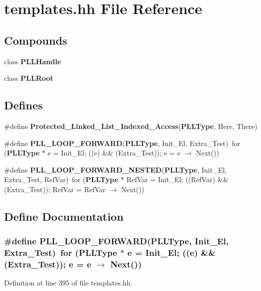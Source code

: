 \section{templates.hh File Reference}
\label{templates_8hh}
\subsection*{Compounds}
\begin{CompactItemize}
\item 
class {\bf PLLHandle}
\item 
class {\bf PLLRoot}
\end{CompactItemize}
\subsection*{Defines}
\begin{CompactItemize}
\item 
\#define {\bf Protected\_\-Linked\_\-List\_\-Indexed\_\-Access}({\bf PLLType}, Here, There)
\item 
\#define {\bf PLL\_\-LOOP\_\-FORWARD}({\bf PLLType}, Init\_\-El, Extra\_\-Test)\ for ({\bf PLLType} $\ast$ e = Init\_\-El; ((e) \&\& (Extra\_\-Test)); e = e $\rightarrow$ Next())
\item 
\#define {\bf PLL\_\-LOOP\_\-FORWARD\_\-NESTED}({\bf PLLType}, Init\_\-El, Extra\_\-Test, Ref\-Var)\ for ({\bf PLLType} $\ast$ Ref\-Var = Init\_\-El; ((Ref\-Var) \&\& (Extra\_\-Test)); Ref\-Var = Ref\-Var $\rightarrow$ Next())
\end{CompactItemize}


\subsection{Define Documentation}
\subsubsection{\setlength{\rightskip}{0pt plus 5cm}\#define PLL\_\-LOOP\_\-FORWARD({\bf PLLType}, Init\_\-El, Extra\_\-Test)\ for ({\bf PLLType} $\ast$ e = Init\_\-El; ((e) \&\& (Extra\_\-Test)); e = e $\rightarrow$ Next())}\label{templates_8hh_a1}




Definition at line 395 of file templates.hh.
